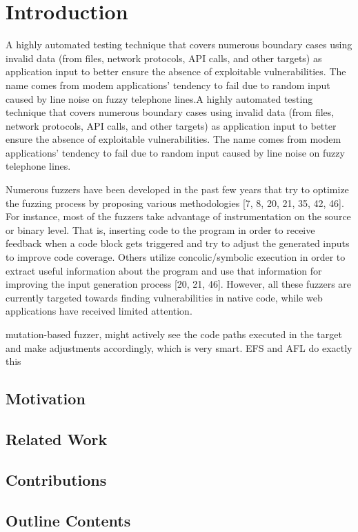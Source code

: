 \chapter{Introduction}
\minitoc
\vspace*{1cm}

A highly automated testing technique that covers numerous boundary cases
using invalid data (from files, network protocols, API calls, and other targets)
as application input to better ensure the absence of exploitable vulnerabilities.
The name comes from modem applications’ tendency to fail due
to random input caused by line noise on fuzzy telephone lines.A highly automated testing technique that covers numerous boundary cases
using invalid data (from files, network protocols, API calls, and other targets)
as application input to better ensure the absence of exploitable vulnerabilities.
The name comes from modem applications’ tendency to fail due
to random input caused by line noise on fuzzy telephone lines.


Numerous fuzzers have been developed in the past few
years that try to optimize the fuzzing process by proposing
various methodologies [7, 8, 20, 21, 35, 42, 46]. For instance,
most of the fuzzers take advantage of instrumentation on
the source or binary level. That is, inserting code to the
program in order to receive feedback when a code block gets
triggered and try to adjust the generated inputs to improve
code coverage. Others utilize concolic/symbolic execution
in order to extract useful information about the program
and use that information for improving the input generation
process [20, 21, 46]. However, all these fuzzers are currently
targeted towards finding vulnerabilities in native code, while
web applications have received limited attention.


mutation-based fuzzer, might actively see the code paths executed in the target and make adjustments accordingly, which is very smart. EFS and AFL do exactly this


\section{Motivation}

\section{Related Work}

\section{Contributions}

\section{Outline Contents}